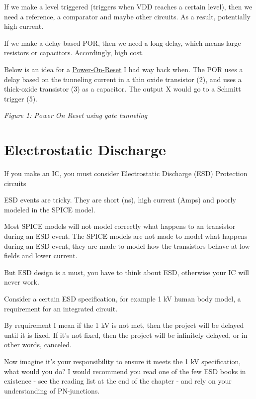 If we make a level triggered (triggers when VDD reaches a certain
level), then we need a reference, a comparator and maybe other circuits.
As a result, potentially high current.

If we make a delay based POR, then we need a long delay, which means
large resistors or capacitors. Accordingly, high cost.

Below is an idea for a
\href{https://patents.google.com/patent/GB2509147A/en?inventor=carsten+wulff&oq=carsten+wulff}{Power-On-Reset}
I had way back when. The POR uses a delay based on the tunneling current
in a thin oxide transistor (2), and uses a thick-oxide transistor (3) as
a capacitor. The output X would go to a Schmitt trigger (5).


{
\centering
{}
}

\emph{Figure 1: Power On Reset using gate tunneling }

\section{Electrostatic Discharge}\label{electrostatic-discharge}

If you make an IC, you must consider Electrostatic Discharge (ESD)
Protection circuits

ESD events are tricky. They are short (ns), high current (Amps) and
poorly modeled in the SPICE model.

Most SPICE models will not model correctly what happens to an transistor
during an ESD event. The SPICE models are not made to model what happens
during an ESD event, they are made to model how the transistors behave
at low fields and lower current.

But ESD design is a must, you have to think about ESD, otherwise your IC
will never work.

Consider a certain ESD specification, for example 1 kV human body model,
a requirement for an integrated circuit.

By requirement I mean if the 1 kV is not met, then the project will be
delayed until it is fixed. If it's not fixed, then the project will be
infinitely delayed, or in other words, canceled.

Now imagine it's your responsibility to ensure it meets the 1 kV
specification, what would you do? I would recommend you read one of the
few ESD books in existence - see the reading list at the end of the
chapter - and rely on your understanding of PN-junctions.

